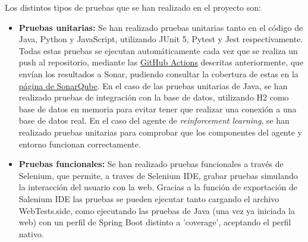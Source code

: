 Los distintos tipos de pruebas que se han realizado en el proyecto son:
\begin{itemize}
    \item \textbf{Pruebas unitarias:} Se han realizado pruebas unitarias tanto  en el código de Java, Python y JavaScript, utilizando JUnit 5, Pytest y Jest respectivamente. Todas estas pruebas se ejecutan automáticamente cada vez que se realiza un push al repositorio, mediante las \hyperref[subsec:acciones]{GitHub Actions} descritas anteriormente, que envían los resultados a Sonar, pudiendo consultar la cobertura de estas en la \hyperref[subsec:sonarqube]{página de SonarQube}. 
    En el caso de las pruebas unitarias de Java, se han realizado pruebas de integración con la base de datos, utilizando H2 como base de datos en memoria para evitar tener que realizar una conexión a una base de datos real. En el caso del agente de \textit{reinforcement learning}, se han realizado pruebas unitarias para comprobar que los componentes del agente y entorno funcionan correctamente.
    \item \textbf{Pruebas funcionales:} Se han realizado pruebas funcionales a través de Selenium, que permite, a traves de Selenium IDE, grabar pruebas simulando la interacción del usuario con la web. Gracias a la función de exportación de Salenium IDE las pruebas se pueden ejecutar tanto cargando el archivo WebTests.side, como ejecutando las pruebas  de Java (una vez ya iniciada la web) con un perfil de Spring Boot distinto a 'coverage', aceptando el perfil nativo.
\end{itemize}
